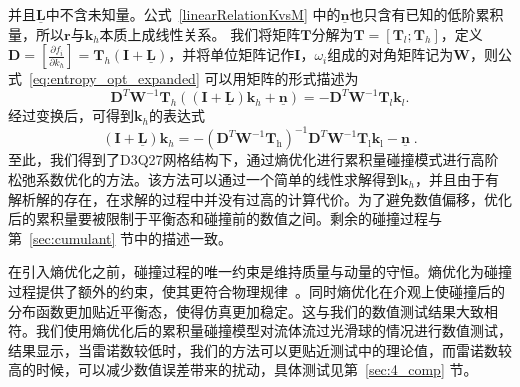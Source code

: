 并且$\bm{\underline{L}}$中不含未知量。公式~\ref{linearRelationKvsM} 中的$\bm{\underline{n}}$也只含有已知的低阶累积量，所以$\bm{r}$与$\bm{k}_h$本质上成线性关系。
我们将矩阵$\bm{T}$分解为$\bm{T} = [\bm{T}_l; \bm{T}_h]$，定义$\bm{D} = [\frac{\partial f_i}{\partial k_h}] = \bm{T}_h(\bm{I} + \bm{\underline{L}})$，并将单位矩阵记作$\bm{I}$，$\omega_i$组成的对角矩阵记为$\bm{W}$，则公式~\ref{eq:entropy_opt_expanded} 可以用矩阵的形式描述为
\begin{equation}
    \bm{D}^T \bm{W}^{-1} \bm{T}_h ((\bm{I} + \bm{\underline{L}}) \bm{k}_h + \bm{\underline{n}}) = -\bm{D}^T \bm{W}^{-1} \bm{T}_l \bm{k}_l .
\end{equation}
经过变换后，可得到$\bm{k}_h$的表达式
\begin{equation} \label{eq:solution}
	(\bm{I} + \bm{\underline{L}}) \bm{k}_h =  -(\bm{D}^T \bm{W}^{-1} \bm{T}_\text{h})^{-1}\bm{D}^T \bm{W}^{-1} \bm{T}_\text{l} \bm{k}_\text{l} - \bm{\underline{n}} \;.
\end{equation}
至此，我们得到了D3Q27网格结构下，通过熵优化进行累积量碰撞模式进行高阶松弛系数优化的方法。该方法可以通过一个简单的线性求解得到$\bm{k}_h$，并且由于有解析解的存在，在求解的过程中并没有过高的计算代价。为了避免数值偏移，优化后的累积量要被限制于平衡态和碰撞前的数值之间。剩余的碰撞过程与第~\ref{sec:cumulant} 节中的描述一致。

在引入熵优化之前，碰撞过程的唯一约束是维持质量与动量的守恒。熵优化为碰撞过程提供了额外的约束，使其更符合物理规律~\citep{Tang-2022}。同时熵优化在介观上使碰撞后的分布函数更加贴近平衡态，使得仿真更加稳定。这与我们的数值测试结果大致相符。我们使用熵优化后的累积量碰撞模型对流体流过光滑球的情况进行数值测试，结果显示，当雷诺数较低时，我们的方法可以更贴近测试中的理论值，而雷诺数较高的时候，可以减少数值误差带来的扰动，具体测试见第~\ref{sec:4_comp} 节。

